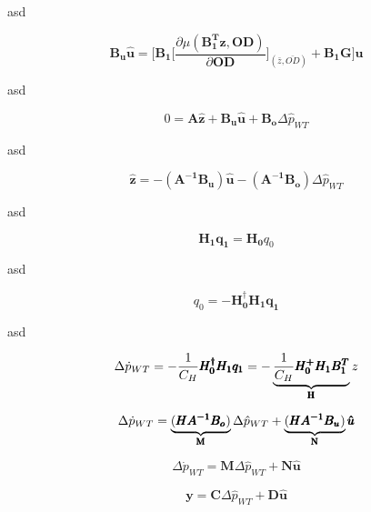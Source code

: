 asd

\begin{equation}
  \pmb{B_u}\pmb{\hat{u}} = \bigg[\pmb{B_1} \bigg[ \frac{\partial{\mu(\pmb{{B_1^{T}}}\pmb{z}, \pmb{OD})}}{{\partial{\pmb{OD}}}}  \bigg]_{(\bar{z}, \bar{OD})} + \pmb{B_1}\pmb{G}\bigg] \pmb{\hat{u}} 
\label{Bumatrix}
\end{equation}

asd

\begin{equation}
 0 = \pmb{A} \pmb{\hat{z}} + \pmb{B_u} \pmb{\hat{u}} + \pmb{B_o} \Delta \hat{p}_{WT}    
 \label{statespace_2}
\end{equation}

asd

\begin{equation}
 \pmb{\hat{z}} = -(\pmb{A^{-1}}\pmb{B_u})\pmb{\hat{u}} - (\pmb{A^{-1}}\pmb{B_o})\Delta \hat{p}_{WT}    
 \label{statespace_2}
\end{equation}

asd

\begin{equation}
 \pmb{H_1}\pmb{q_1} = \pmb{H_0}q_0  
 \label{currentlaw_1}
\end{equation}

asd

\begin{equation}
q_0 = -\pmb{H^{\dagger}_0}\pmb{H_1}\pmb{q_1}
 \label{currentlaw_2}
\end{equation}

asd

\begin{equation}
\Delta \dot{p}_{WT} = - \frac{1}{C_H} \pmb{H^{\dagger}_0}\pmb{H_1}\pmb{q_1} = - \underbrace{\frac{1}{C_H} \pmb{H^+_0}\pmb{H_1}\pmb{{B_1^{T}}}}_\text{\pmb{H}} z
 \label{currentlaw_2}
\end{equation}

\begin{equation}
\Delta \dot{p}_{WT} = \underbrace{(\pmb{H}\pmb{A^{-1}}\pmb{B_o})}_\text{\pmb{M}}\Delta \hat{p}_{WT}  + \underbrace{(\pmb{H}\pmb{A^{-1}}\pmb{B_u})}_\text{\pmb{N}}\pmb{\hat{u}}  
 \label{statespace_3}
\end{equation}

\begin{equation}
\Delta \dot{p}_{WT} = \pmb{M} \Delta \hat{p}_{WT}  + \pmb{N}\pmb{\hat{u}}  
 \label{statespace_4}
\end{equation}

\begin{equation}
\pmb{y} = \pmb{C} \Delta \hat{p}_{WT}  + \pmb{D}\pmb{\hat{u}}  
 \label{statespace_5}
\end{equation}

